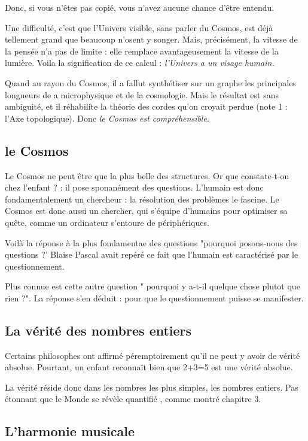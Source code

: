 \documentclass[a4paper,12pt]{article}
\begin{document}
Donc, si vous n'êtes pas copié, vous n'avez aucune chance d'être entendu.

Une difficulté, c'est que l'Univers visible, sans parler du Cosmos, est déjà tellement grand que beaucoup n'osent y songer. Mais, précisément, la vitesse de la pensée n'a pas de limite : elle remplace avantageusement la vitesse de la lumière. Voila la signification de ce calcul : \textit{l'Univers a un visage humain.}


Quand au rayon du Cosmos, il a fallut synthétiser sur un graphe les principales longueurs de a microphysique et de la cosmologie. Mais le résultat est sans ambiguité, et il réhabilite la théorie des cordes qu'on croyait perdue (note 1 : l'Axe topologique). Donc \textit {le Cosmos est compréhensible}.


\subsection {le Cosmos}

Le Cosmos ne peut être que la plus belle des structures. Or que constate-t-on chez l'enfant ? : il pose sponanément des questions. L'humain est donc fondamentalement un chercheur : la résolution des problèmes le fascine. Le Cosmos est donc aussi un chercher, qui s'équipe d'humains pour optimiser sa quête, comme un ordinateur s'entoure de périphériques.

Voilà la réponse à la plus fondamentae des questions "pourquoi posons-nous des questions ?' Blaise Pascal avait repéré ce fait que l'humain est caractérisé par le questionnement.

Plus connue est cette autre question " pourquoi y a-t-il quelque chose plutot que rien ?". La réponse s'en déduit : pour que le questionnement puisse se manifester.


\subsection{La vérité des nombres entiers}

Certains philosophes ont affirmé péremptoirement qu'il ne peut y avoir de vérité absolue. Pourtant, un enfant reconnaît bien que 2+3=5 est une vérité absolue.

La vérité réside donc dans les nombres les plus simples, les nombres entiers. Pas étonnant que le Monde se révèle quantifié , comme montré chapitre 3.

\subsection{L'harmonie musicale}
\end{document}
